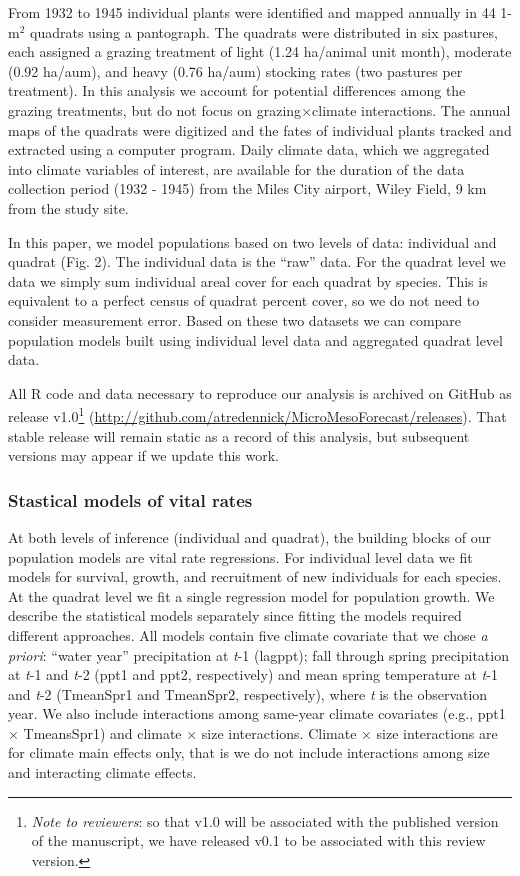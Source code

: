 \documentclass[12pt,]{article}
\begin{document}
From 1932 to 1945 individual plants were identified and mapped annually
in 44 1-$\text{m}^2$ quadrats using a pantograph. The quadrats were
distributed in six pastures, each assigned a grazing treatment of light
(1.24 ha/animal unit month), moderate (0.92 ha/aum), and heavy (0.76
ha/aum) stocking rates (two pastures per treatment). In this analysis we
account for potential differences among the grazing treatments, but do
not focus on grazing$\times$climate interactions. The annual maps of the
quadrats were digitized and the fates of individual plants tracked and
extracted using a computer program. Daily climate data, which we
aggregated into climate variables of interest, are available for the
duration of the data collection period (1932 - 1945) from the Miles City
airport, Wiley Field, 9 km from the study site.

In this paper, we model populations based on two levels of data:
individual and quadrat (Fig. 2). The individual data is the ``raw''
data. For the quadrat level we data we simply sum individual areal cover
for each quadrat by species. This is equivalent to a perfect census of
quadrat percent cover, so we do not need to consider measurement error.
Based on these two datasets we can compare population models built using
individual level data and aggregated quadrat level data.

All R code and data necessary to reproduce our analysis is archived on
GitHub as release v1.0\footnote{\emph{Note to reviewers}: so that v1.0
  will be associated with the published version of the manuscript, we
  have released v0.1 to be associated with this review version.}
(\url{http://github.com/atredennick/MicroMesoForecast/releases}). That
stable release will remain static as a record of this analysis, but
subsequent versions may appear if we update this work.

\subsubsection{Stastical models of vital
rates}\label{stastical-models-of-vital-rates}

At both levels of inference (individual and quadrat), the building
blocks of our population models are vital rate regressions. For
individual level data we fit models for survival, growth, and
recruitment of new individuals for each species. At the quadrat level we
fit a single regression model for population growth. We describe the
statistical models separately since fitting the models required
different approaches. All models contain five climate covariate that we
chose \emph{a priori}: ``water year'' precipitation at \emph{t}-1
(lagppt); fall through spring precipitation at \emph{t}-1 and \emph{t}-2
(ppt1 and ppt2, respectively) and mean spring temperature at \emph{t}-1
and \emph{t}-2 (TmeanSpr1 and TmeanSpr2, respectively), where \emph{t}
is the observation year. We also include interactions among same-year
climate covariates (e.g., ppt1 $\times$ TmeansSpr1) and climate $\times$
size interactions. Climate $\times$ size interactions are for climate
main effects only, that is we do not include interactions among size and
interacting climate effects.
\end{document}
